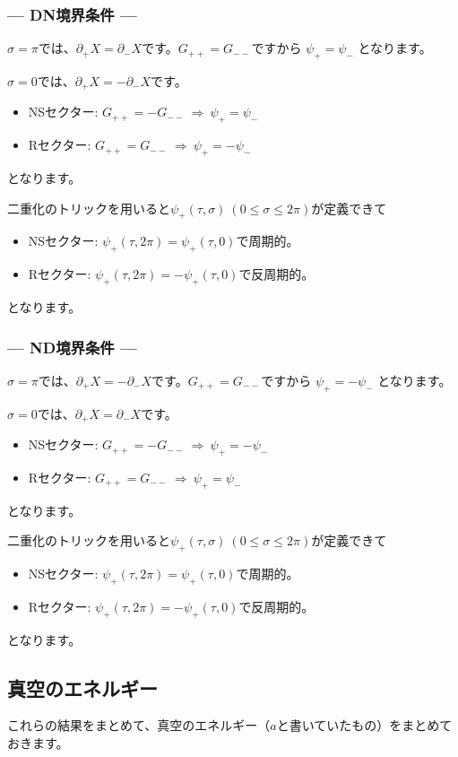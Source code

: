 \documentclass[report,paper=a4, fontsize=12pt, line_length=16cm, number_of_lines=34,dvipdfmx]{jlreq}
\numberwithin{equation}{chapter}
\numberwithin{equation}{section}
\newcommand{\del}{\partial}
\begin{document}
\subsubsection*{--- DN境界条件 ---}
$\sigma=\pi$では、$\del_{+}X=\del_{-}X$です。$G_{++}=G_{--}$ですから
$\psi_{+}=\psi_{-}$
となります。

$\sigma=0$では、$\del_{+}X=-\del_{-}X$です。
\begin{itemize}
  \item NSセクター: $G_{++}=-G_{--}\ \Rightarrow\ 
  \psi_{+}=\psi_{-}$
  \item Rセクター: $G_{++}=G_{--}\ \Rightarrow\ 
  \psi_{+}=-\psi_{-}$
\end{itemize}
となります。

二重化のトリックを用いると$\psi_{+}(\tau,\sigma)\ (0\le \sigma \le 2\pi)$が定義できて
\begin{itemize}
  \item NSセクター: $\psi_{+}(\tau,2\pi)=\psi_{+}(\tau,0)$で周期的。
  \item Rセクター: $\psi_{+}(\tau,2\pi)=-\psi_{+}(\tau,0)$で反周期的。
\end{itemize}
となります。


\subsubsection*{--- ND境界条件 ---}
$\sigma=\pi$では、$\del_{+}X=-\del_{-}X$です。$G_{++}=G_{--}$ですから
$\psi_{+}=-\psi_{-}$
となります。

$\sigma=0$では、$\del_{+}X=\del_{-}X$です。
\begin{itemize}
  \item NSセクター: $G_{++}=-G_{--}\ \Rightarrow\ 
  \psi_{+}=-\psi_{-}$
  \item Rセクター: $G_{++}=G_{--}\ \Rightarrow\ 
  \psi_{+}=\psi_{-}$
\end{itemize}
となります。

二重化のトリックを用いると$\psi_{+}(\tau,\sigma)\ (0\le \sigma \le 2\pi)$が定義できて
\begin{itemize}
  \item NSセクター: $\psi_{+}(\tau,2\pi)=\psi_{+}(\tau,0)$で周期的。
  \item Rセクター: $\psi_{+}(\tau,2\pi)=-\psi_{+}(\tau,0)$で反周期的。
\end{itemize}
となります。


\subsection{真空のエネルギー}
これらの結果をまとめて、真空のエネルギー（$a$と書いていたもの）をまとめておきます。
\end{document}
